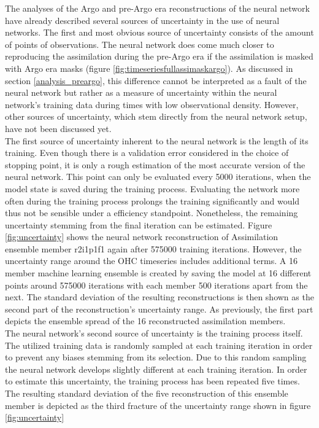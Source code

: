 \documentclass[Masterarbeit.tex]{subfile}
\begin{document}
	The analyses of the Argo and pre-Argo era reconstructions of the neural network have already described several sources of uncertainty in the use of neural networks. The first and most obvious source of uncertainty consists of the amount of points of observations. The neural network does come much closer to reproducing the assimilation during the pre-Argo era if the assimilation is masked with Argo era masks (figure \ref{fig:timeseriesfullassimaskargo}). As discussed in section \ref{analysis_preargo}, this difference cannot be interpreted as a fault of the neural network but rather as a measure of uncertainty within the neural network's training data during times with low observational density. However, other sources of uncertainty, which stem directly from the neural network setup, have not been discussed yet. \\
	The first source of uncertainty inherent to the neural network is the length of its training. Even though there is a validation error considered in the choice of stopping point, it is only a rough estimation of the most accurate version of the neural network. This point can only be evaluated every 5000 iterations, when the model state is saved during the training process. Evaluating the network more often during the training process prolongs the training significantly and would thus not be sensible under a efficiency standpoint. Nonetheless, the remaining uncertainty stemming from the final iteration can be estimated. Figure \ref{fig:uncertainty} shows the neural network reconstruction of Assimilation ensemble member r2i1p1f1 again after 575000 training iterations. However, the uncertainty range around the OHC timeseries includes additional terms. A 16 member machine learning ensemble is created by saving the model at 16 different points around 575000 iterations with each member 500 iterations apart from the next. The standard deviation of the resulting reconstructions is then shown as the second part of the reconstruction's uncertainty range. As previously, the first part depicts the ensemble spread of the 16 reconstructed assimilation members.\\
	The neural network's second source of uncertainty is the training process itself. The utilized training data is randomly sampled at each training iteration in order to prevent any biases stemming from its selection. Due to this random sampling the neural network develops slightly different at each training iteration. In order to estimate this uncertainty, the training process has been repeated five times. The resulting standard deviation of the five reconstruction of this ensemble member is depicted as the third fracture of the uncertainty range shown in figure \ref{fig:uncertainty}
	
\end{document}

